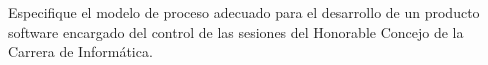 Especifique el modelo de proceso adecuado para el desarrollo de un producto software encargado del
control de las sesiones del Honorable Concejo de la Carrera de Informática.
